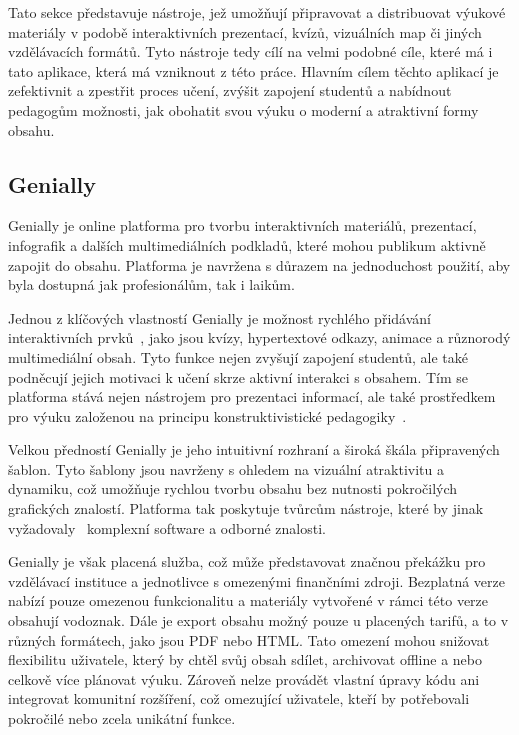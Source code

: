 Tato sekce představuje nástroje, jež umožňují připravovat a distribuovat výukové materiály v podobě interaktivních prezentací, kvízů, vizuálních map či jiných vzdělávacích formátů.
Tyto nástroje tedy cílí na velmi podobné cíle, které má i tato aplikace, která má vzniknout z této práce.
Hlavním cílem těchto aplikací je zefektivnit a zpestřit proces učení, zvýšit zapojení studentů a nabídnout pedagogům možnosti, jak obohatit svou výuku o moderní a atraktivní formy obsahu.

\subsection{Genially}

Genially je online platforma pro tvorbu interaktivních materiálů, prezentací, infografik a dalších multimediálních podkladů, které mohou publikum aktivně zapojit do obsahu.
Platforma je navržena s důrazem na jednoduchost použití, aby byla dostupná jak profesionálům, tak i laikům.

Jednou z klíčových vlastností Genially je možnost rychlého přidávání interaktivních prvků~\cite{genially}, jako jsou kvízy, hypertextové odkazy, animace a různorodý multimediální obsah. 
Tyto funkce nejen zvyšují zapojení studentů, ale také podněcují jejich motivaci k učení skrze aktivní interakci s obsahem. 
Tím se platforma stává nejen nástrojem pro prezentaci informací, ale také prostředkem pro výuku založenou na principu konstruktivistické pedagogiky~\cite{konstruktivismus}. 

Velkou předností Genially je jeho intuitivní rozhraní a široká škála připravených šablon.
Tyto šablony jsou navrženy s ohledem na vizuální atraktivitu a dynamiku, což umožňuje rychlou tvorbu obsahu bez nutnosti pokročilých grafických znalostí.
Platforma tak poskytuje tvůrcům nástroje, které by jinak vyžadovaly~\cite{genially} komplexní software a odborné znalosti.

Genially je však placená služba, což může představovat značnou překážku pro vzdělávací instituce a jednotlivce s omezenými finančními zdroji. 
Bezplatná verze nabízí pouze omezenou funkcionalitu a materiály vytvořené v rámci této verze obsahují vodoznak.
Dále je export obsahu možný pouze u placených tarifů, a to v různých formátech, jako jsou PDF nebo HTML. 
Tato omezení mohou snižovat flexibilitu uživatele, který by chtěl svůj obsah sdílet, archivovat offline a nebo celkově více plánovat výuku. 
Zároveň nelze provádět vlastní úpravy kódu ani integrovat komunitní rozšíření, což omezující uživatele, kteří by potřebovali pokročilé nebo zcela unikátní funkce.

